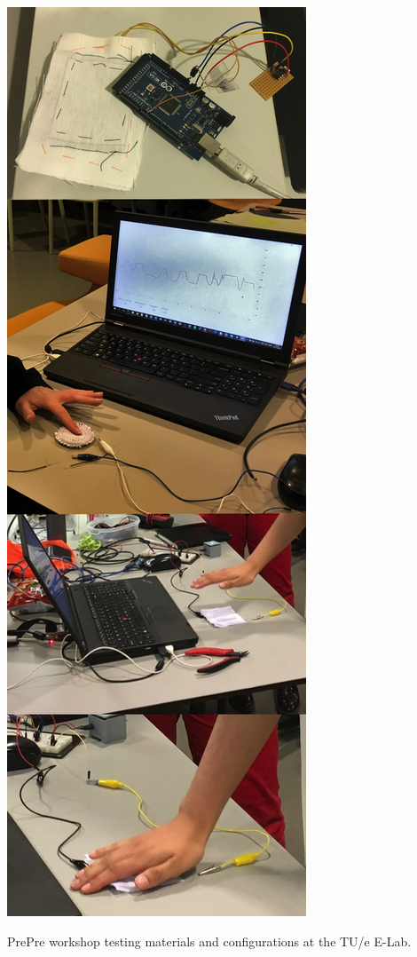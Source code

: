 \documentclass{sigchi-ext}
\begin{document}
\begin{marginfigure}
\begin{minipage}{\marginparwidth}
\centering
\includegraphics[trim={0 0 0 -11.5cm},clip,width=0.9\columnwidth]{figures/workshop}
 \caption{PrePre workshop testing materials and configurations at the TU/e E-Lab.}~\label{fig:workshop}
\end{minipage}
\end{marginfigure}
\end{document}
